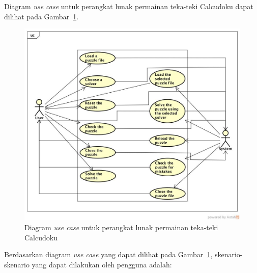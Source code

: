 Diagram \textit{use case} untuk perangkat lunak permainan teka-teki Calcudoku dapat dilihat pada Gambar~\ref{fig:analisisusecase}.

\begin{figure}
\centering
\captionsetup{justification=centering}
\includegraphics[scale=0.4]{Gambar/Analisis/DiagramUseCase}
\caption[Diagram \textit{use case} untuk perangkat lunak permainan teka-teki Calcudoku]{Diagram \textit{use case} untuk perangkat lunak permainan teka-teki Calcudoku}
\label{fig:analisisusecase}
\end{figure}

Berdasarkan diagram \textit{use case} yang dapat dilihat pada Gambar~\ref{fig:analisisusecase}, skenario-skenario yang dapat dilakukan oleh pengguna adalah:

